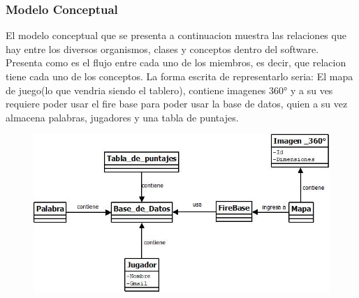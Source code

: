 \subsubsection{Modelo Conceptual}
El modelo conceptual que se presenta a continuacion muestra las relaciones que hay entre los diversos organismos, clases y conceptos dentro del software. Presenta como es el flujo entre cada uno de los miembros, es decir, que relacion tiene cada uno de los conceptos. La forma escrita de representarlo seria:
El mapa de juego(lo que vendria siendo el tablero), contiene imagenes 360° y a su ves requiere poder usar el fire base para poder usar la base de datos, quien a su vez almacena palabras, jugadores y una tabla de puntajes.
\begin{figure}[H]
\centering
   \includegraphics[scale=0.9]{imgs/ModeloConceptual.jpeg}
\end{figure}
